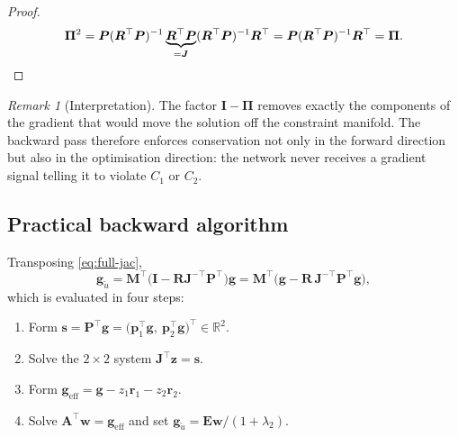 \documentclass[11pt,a4paper]{article}
\theoremstyle{remark}
\newtheorem{remark}{Remark}
\newcommand{\R}{\mathbb{R}}
\newcommand{\ut}{\tilde{u}}
\begin{document}
\begin{proof}
\begin{equation}
\bm\Pi^2 = \bm{P}(\bm{R}^\top\bm{P})^{-1}\underbrace{\bm{R}^\top\bm{P}}_{=\bm{J}}
(\bm{R}^\top\bm{P})^{-1}\bm{R}^\top
= \bm{P}(\bm{R}^\top\bm{P})^{-1}\bm{R}^\top = \bm\Pi . \qedhere
\end{equation}
\end{proof}

\begin{remark}[Interpretation]
The factor $\bm{I}-\bm\Pi$ removes exactly the components of the gradient that
would move the solution off the constraint manifold. The backward pass therefore
enforces conservation not only in the forward direction but also in the
optimisation direction: the network never receives a gradient signal telling it
to violate $C_1$ or $C_2$.
\end{remark}

\subsection{Practical backward algorithm}

Transposing \eqref{eq:full-jac},
\begin{equation}
\bm{g}_{\ut}
= \bm{M}^\top\Big(\bm{I} - \bm{R}\bm{J}^{-\top}\bm{P}^\top\Big)\bm{g}
= \bm{M}^\top\Big(\bm{g} - \bm{R}\,\bm{J}^{-\top}\bm{P}^\top\bm{g}\Big),
\end{equation}
which is evaluated in four steps:

\begin{enumerate}[label=\textbf{\arabic*.}, leftmargin=2.2em]
\item Form $\bm{s} = \bm{P}^\top\bm{g}
      = \big(\bm{p}_1^\top\bm{g},\ \bm{p}_2^\top\bm{g}\big)^\top \in \R^2$.
\item Solve the $2\times2$ system $\bm{J}^\top\bm{z} = \bm{s}$.
\item Form $\bm{g}_{\text{eff}} = \bm{g} - z_1\bm{r}_1 - z_2\bm{r}_2$.
\item Solve $\bm{A}^\top\bm{w} = \bm{g}_{\text{eff}}$ and set
      $\bm{g}_{\ut} = \bm{E}\bm{w}/(1+\lambda_2)$.
\end{enumerate}
\end{document}
